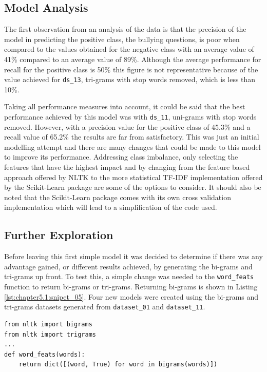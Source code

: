 \subsection{Model Analysis}
The first observation from an analysis of the data is that the precision of the model in predicting the positive class, the bullying questions, is poor when compared to the values obtained for the negative class with an average value of 41\% compared to an average value of 89\%. Although the average performance for recall for the positive class is 50\% this figure is not representative because of the value achieved for \verb|ds_13|, tri-grams with stop words removed, which is less than 10\%. 

Taking all performance measures into account, it could be said that the best performance achieved by this model was with \verb|ds_11|, uni-grams with stop words removed. However, with a precision value for the positive class of 45.3\% and a recall value of 65.2\% the results are far from satisfactory. This was just an initial modelling attempt and there are many changes that could be made to this model to improve its performance. Addressing class imbalance, only selecting the features that have the highest impact and by changing from the feature based approach offered by NLTK to the more statistical TF-IDF implementation offered by the Scikit-Learn package are some of the options to consider. It should also be noted that the Scikit-Learn package comes with its own cross validation implementation which will lead to a simplification of the code used.

\subsection{Further Exploration}

Before leaving this first simple model it was decided to determine if there was any advantage gained, or different results achieved, by generating the bi-grams and tri-grams up front. To test this, a simple change was needed to the \verb|word_feats| function to return bi-grams or tri-grams. Returning bi-grams is shown in Listing \ref{lst:chapter5.1:snipet_05}. Four new models were created using the bi-grams and tri-grams datasets generated from \verb|dataset_01| and \verb|dataset_11|.

\begin{lstlisting}[caption={Generation of the positive and negative feature dictionaries},label=lst:chapter5.1:snipet_05]
from nltk import bigrams
from nltk import trigrams
...
def word_feats(words):
    return dict([(word, True) for word in bigrams(words)])
\end{lstlisting}

